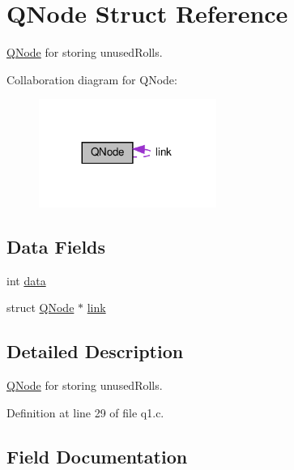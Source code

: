 \hypertarget{struct_q_node}{}\section{Q\+Node Struct Reference}
\label{struct_q_node}


\hyperlink{struct_q_node}{Q\+Node} for storing unused\+Rolls.  




Collaboration diagram for Q\+Node\+:
\nopagebreak
\begin{figure}[H]
\begin{center}
\leavevmode
\includegraphics[width=164pt]{struct_q_node__coll__graph}
\end{center}
\end{figure}
\subsection*{Data Fields}
\begin{DoxyCompactItemize}
\item 
int \hyperlink{struct_q_node_a9eab91667db4d35c7231dcddf7b89a76}{data}
\item 
struct \hyperlink{struct_q_node}{Q\+Node} $\ast$ \hyperlink{struct_q_node_aeb974434dabad67698cafa3278f141a0}{link}
\end{DoxyCompactItemize}


\subsection{Detailed Description}
\hyperlink{struct_q_node}{Q\+Node} for storing unused\+Rolls. 

Definition at line 29 of file q1.\+c.



\subsection{Field Documentation}
\mbox{\label{struct_q_node_a9eab91667db4d35c7231dcddf7b89a76}} 
